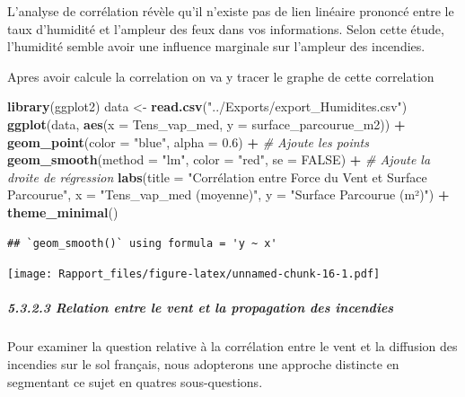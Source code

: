 \documentclass[
]{article}
\newenvironment{Shaded}{\begin{snugshade}}{\end{snugshade}}
\newcommand{\AttributeTok}[1]{\textcolor[rgb]{0.13,0.29,0.53}{#1}}
\newcommand{\CommentTok}[1]{\textcolor[rgb]{0.56,0.35,0.01}{\textit{#1}}}
\newcommand{\ConstantTok}[1]{\textcolor[rgb]{0.56,0.35,0.01}{#1}}
\newcommand{\FloatTok}[1]{\textcolor[rgb]{0.00,0.00,0.81}{#1}}
\newcommand{\FunctionTok}[1]{\textcolor[rgb]{0.13,0.29,0.53}{\textbf{#1}}}
\newcommand{\NormalTok}[1]{#1}
\newcommand{\OtherTok}[1]{\textcolor[rgb]{0.56,0.35,0.01}{#1}}
\newcommand{\SpecialCharTok}[1]{\textcolor[rgb]{0.81,0.36,0.00}{\textbf{#1}}}
\newcommand{\StringTok}[1]{\textcolor[rgb]{0.31,0.60,0.02}{#1}}
\begin{document}
L'analyse de corrélation révèle qu'il n'existe pas de lien linéaire
prononcé entre le taux d'humidité et l'ampleur des feux dans vos
informations. Selon cette étude, l'humidité semble avoir une influence
marginale sur l'ampleur des incendies.

Apres avoir calcule la correlation on va y tracer le graphe de cette
correlation

\begin{Shaded}
\begin{Highlighting}[]
\FunctionTok{library}\NormalTok{(ggplot2)}
\NormalTok{data }\OtherTok{\textless{}{-}} \FunctionTok{read.csv}\NormalTok{(}\StringTok{"../Exports/export\_Humidites.csv"}\NormalTok{)}
\FunctionTok{ggplot}\NormalTok{(data, }\FunctionTok{aes}\NormalTok{(}\AttributeTok{x =}\NormalTok{ Tens\_vap\_med, }\AttributeTok{y =}\NormalTok{ surface\_parcourue\_m2)) }\SpecialCharTok{+}
  \FunctionTok{geom\_point}\NormalTok{(}\AttributeTok{color =} \StringTok{"blue"}\NormalTok{, }\AttributeTok{alpha =} \FloatTok{0.6}\NormalTok{) }\SpecialCharTok{+}  \CommentTok{\# Ajoute les points}
  \FunctionTok{geom\_smooth}\NormalTok{(}\AttributeTok{method =} \StringTok{"lm"}\NormalTok{, }\AttributeTok{color =} \StringTok{"red"}\NormalTok{, }\AttributeTok{se =} \ConstantTok{FALSE}\NormalTok{) }\SpecialCharTok{+}  \CommentTok{\# Ajoute la droite de régression}
  \FunctionTok{labs}\NormalTok{(}\AttributeTok{title =} \StringTok{"Corrélation entre Force du Vent et Surface Parcourue"}\NormalTok{,}
       \AttributeTok{x =} \StringTok{"Tens\_vap\_med (moyenne)"}\NormalTok{,}
       \AttributeTok{y =} \StringTok{"Surface Parcourue (m²)"}\NormalTok{) }\SpecialCharTok{+}
  \FunctionTok{theme\_minimal}\NormalTok{()}
\end{Highlighting}
\end{Shaded}

\begin{verbatim}
## `geom_smooth()` using formula = 'y ~ x'
\end{verbatim}

\texttt{[image: Rapport\_files/figure-latex/unnamed-chunk-16-1.pdf]}

\subparagraph{5.3.2.3 Relation entre le vent et la propagation des
incendies}\label{relation-entre-le-vent-et-la-propagation-des-incendies}

Pour examiner la question relative à la corrélation entre le vent et la
diffusion des incendies sur le sol français, nous adopterons une
approche distincte en segmentant ce sujet en quatres sous-questions.
\end{document}
